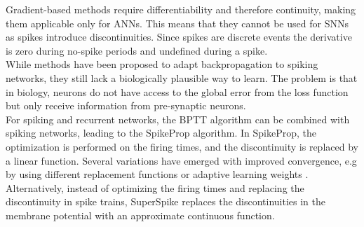 	Gradient-based methods require differentiability and therefore continuity, making them applicable only for \acp{ANN}. This means that they cannot be used for \acp{SNN} as spikes introduce discontinuities. Since spikes are discrete events the derivative is zero during no-spike periods and undefined during a spike.\\
	While methods have been proposed to adapt backpropagation to spiking networks\cite{lee_training_2016}, they still lack a biologically plausible way to learn. The problem is that in biology, neurons do not have access to the global error from the loss function but only receive information from pre-synaptic neurons.\\
	For spiking and recurrent networks, the \ac{BPTT} algorithm can be combined with spiking networks, leading to the SpikeProp\cite{bohte_spikeprop_2000} algorithm. In SpikeProp, the optimization is performed on the firing times, and the discontinuity is replaced by a linear function. Several variations have emerged with improved convergence\cite{mckennoch_fast_2006}, e.g by using different replacement functions \cite{thiruvarudchelvan_analysis_2013,neftci_surrogate_2019} or adaptive learning weights \cite{shrestha_adaptive_2015}.
	Alternatively, instead of optimizing the firing times and replacing the discontinuity in spike trains, SuperSpike\cite{zenke_superspike_2018} replaces the discontinuities in the membrane potential with an approximate continuous function.\\
